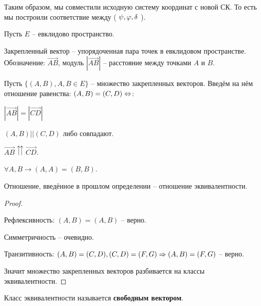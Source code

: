 	\begin{figure*}
		\centering
		\def\svgwidth{0.3\columnwidth}
		
	\end{figure*}

	Таким образом, мы совместили исходную систему координат с новой СК. То есть
	мы построили соответствие между ( $\psi, \varphi, \delta$ ).
	

	Пусть $E$ -- евклидово пространство.
	\begin{Def}
		Закрепленный вектор -- упорядоченная пара точек в евклидовом пространстве.
		Обозначение: $\overrightarrow{AB}$, модуль $|\overrightarrow{AB}|$ -- расстояние между точками $A$ и $B$.
	\end{Def}

	\begin{Def}
		Пусть $\{(A, B), A, B \in E\}$ -- множество закрепленных векторов. Введём на нём отношение равенства:
		$(A, B) = (C, D) \Leftrightarrow$:
		\begin{MyList}
			\item $|\overrightarrow{AB}| = |\overrightarrow{CD}|$ 
			\item $(A, B) || (C, D)$ либо совпадают.
			\item $\overrightarrow{AB} \upuparrows \overrightarrow{CD}$. 
		\end{MyList}
	\end{Def}

	\begin{Rem}
		$\forall A, B \to (A, A) = (B, B)$.
	\end{Rem}

	\begin{Prop}
		Отношение, введённое в прошлом определении -- отношение эквивалентности.
	\end{Prop}

	\begin{proof}
		\begin{MyList}
			\item Рефлексивность: $(A, B) = (A, B)$ -- верно.
			\item Симметричность -- очевидно.
			\item Транзитивность: $(A, B) = (C, D), (C, D) = (F, G) \Rightarrow (A, B) = (F, G)$ -- верно.
		\end{MyList}
		Значит множество закрепленных векторов разбивается на классы эквивалентности.
	\end{proof}

	\begin{Def}
		Класс эквивалентности называется \textbf{свободным вектором}.
	\end{Def}

